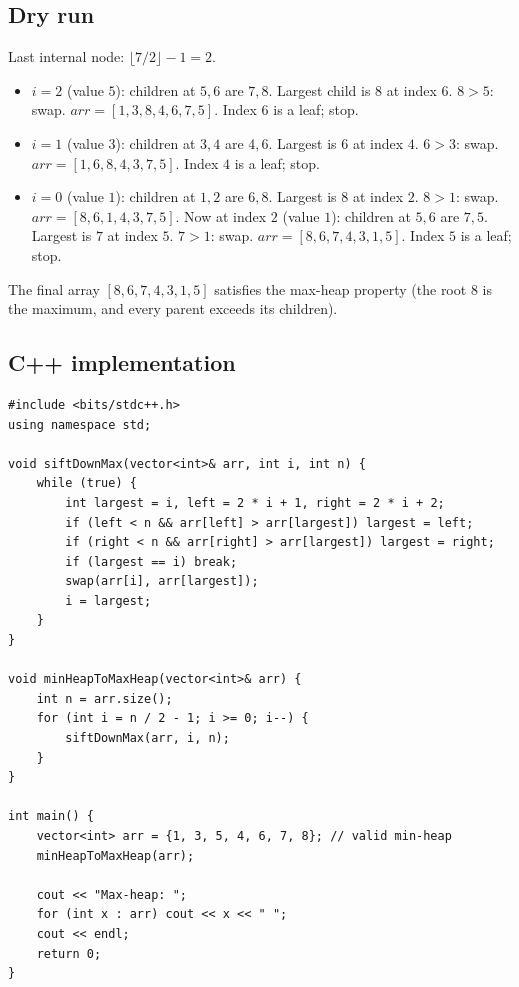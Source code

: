 \subsection*{Dry run}


Last internal node: $\lfloor 7/2 \rfloor - 1 = 2$.

\begin{itemize}
  \item $i=2$ (value $5$): children at $5,6$ are $7,8$. Largest child is
        $8$ at index $6$. $8>5$: swap. $\textit{arr}=[1,3,8,4,6,7,5]$.
        Index $6$ is a leaf; stop.
  \item $i=1$ (value $3$): children at $3,4$ are $4,6$. Largest is $6$ at
        index $4$. $6>3$: swap. $\textit{arr}=[1,6,8,4,3,7,5]$. Index $4$
        is a leaf; stop.
  \item $i=0$ (value $1$): children at $1,2$ are $6,8$. Largest is $8$ at
        index $2$. $8>1$: swap. $\textit{arr}=[8,6,1,4,3,7,5]$. Now at
        index $2$ (value $1$): children at $5,6$ are $7,5$. Largest is
        $7$ at index $5$. $7>1$: swap.
        $\textit{arr}=[8,6,7,4,3,1,5]$. Index $5$ is a leaf; stop.
\end{itemize}

The final array $[8,6,7,4,3,1,5]$ satisfies the max-heap property (the
root $8$ is the maximum, and every parent exceeds its children).

\subsection*{C++ implementation}

\begin{lstlisting}
#include <bits/stdc++.h>
using namespace std;

void siftDownMax(vector<int>& arr, int i, int n) {
    while (true) {
        int largest = i, left = 2 * i + 1, right = 2 * i + 2;
        if (left < n && arr[left] > arr[largest]) largest = left;
        if (right < n && arr[right] > arr[largest]) largest = right;
        if (largest == i) break;
        swap(arr[i], arr[largest]);
        i = largest;
    }
}

void minHeapToMaxHeap(vector<int>& arr) {
    int n = arr.size();
    for (int i = n / 2 - 1; i >= 0; i--) {
        siftDownMax(arr, i, n);
    }
}

int main() {
    vector<int> arr = {1, 3, 5, 4, 6, 7, 8}; // valid min-heap
    minHeapToMaxHeap(arr);

    cout << "Max-heap: ";
    for (int x : arr) cout << x << " ";
    cout << endl;
    return 0;
}
\end{lstlisting}

